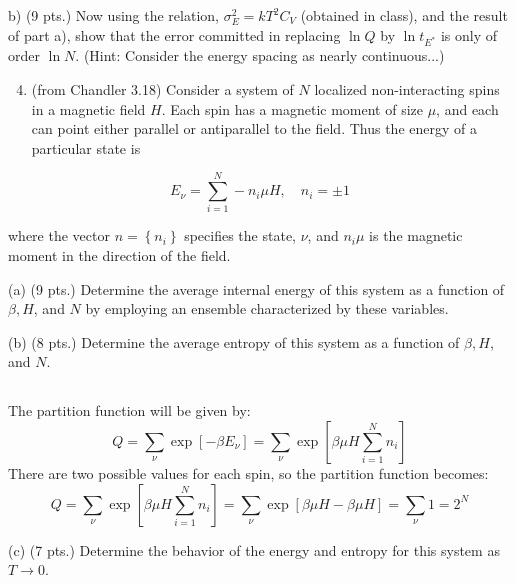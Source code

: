 \documentclass[10pt]{article}
\begin{document}
b) (9 pts.) Now using the relation, $\sigma_{E}^{2}=k T^{2} C_{V}$ (obtained in class), and the result of part a), show that the error committed in replacing $\ln Q$ by $\ln t_{E^{*}}$ is only of order $\ln N$. (Hint: Consider the energy spacing as nearly continuous...)

\begin{enumerate}
  \setcounter{enumi}{3}
  \item (from Chandler 3.18) Consider a system of $N$ localized non-interacting spins in a magnetic field $H$. Each spin has a magnetic moment of size $\mu$, and each can point either parallel or antiparallel to the field. Thus the energy of a particular state is
\end{enumerate}

$$
E_{\nu}=\sum_{i=1}^{N}-n_{i} \mu H, \quad n_{i}= \pm 1
$$

where the vector $n=\left\{n_{i}\right\}$ specifies the state, $\nu$, and $n_{i} \mu$ is the magnetic moment in the direction of the field.

(a) (9 pts.) Determine the average internal energy of this system as a function of $\beta, H$, and $N$ by employing an ensemble characterized by these variables.

(b) (8 pts.) Determine the average entropy of this system as a function of $\beta, H$, and $N$.
\subsection{}
The partition function will be given by:
\begin{equation}
  Q = \sum_{\nu} \exp \left[ - \beta E_{\nu} \right] = \sum_{\nu} \exp \left[ \beta \mu H \sum_{i=1}^{N} n_{i} \right]
\end{equation}
There are two possible values for each spin, so the partition function becomes:
\begin{equation}
  Q = \sum_{\nu} \exp \left[ \beta \mu H \sum_{i=1}^{N} n_{i} \right] = \sum_{\nu} \exp \left[ \beta \mu H - \beta \mu H \right] = \sum_{\nu} 1 = 2^{N}
\end{equation}

(c) (7 pts.) Determine the behavior of the energy and entropy for this system as $T \rightarrow 0$.
\end{document}
